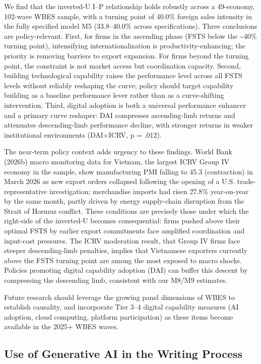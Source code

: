 \documentclass[
  12pt,a4paper]{article}
\begin{document}
We find that the inverted-U I--P relationship holds robustly across a
49-economy, 102-wave WBES sample, with a turning point of 40.0\% foreign
sales intensity in the fully specified model M5 (33.8--40.0\% across
specifications). Three conclusions are policy-relevant. First, for firms
in the ascending phase (FSTS below the \textasciitilde40\% turning
point), intensifying internationalization is productivity-enhancing; the
priority is removing barriers to export expansion. For firms beyond the
turning point, the constraint is not market access but coordination
capacity. Second, building technological capability raises the
performance level across all FSTS levels without reliably reshaping the
curve; policy should target capability building as a baseline
performance lever rather than as a curve-shifting intervention. Third,
digital adoption is both a universal performance enhancer and a primary
curve reshaper: DAI compresses ascending-limb returns and attenuates
descending-limb performance decline, with stronger returns in weaker
institutional environments (DAI×ICRV, p = .012).

The near-term policy context adds urgency to these findings. World Bank
(2026b) macro monitoring data for Vietnam, the largest ICRV Group IV
economy in the sample, show manufacturing PMI falling to 45.3
(contraction) in March 2026 as new export orders collapsed following the
opening of a U.S. trade-representative investigation; merchandise
imports had risen 27.8\% year-on-year by the same month, partly driven
by energy supply-chain disruption from the Strait of Hormuz conflict.
These conditions are precisely those under which the right-side of the
inverted-U becomes consequential: firms pushed above their optimal FSTS
by earlier export commitments face amplified coordination and input-cost
pressures. The ICRV moderation result, that Group IV firms face steeper
descending-limb penalties, implies that Vietnamese exporters currently
above the FSTS turning point are among the most exposed to macro shocks.
Policies promoting digital capability adoption (DAI) can buffer this
descent by compressing the descending limb, consistent with our M8/M9
estimates.

Future research should leverage the growing panel dimensions of WBES to
establish causality, and incorporate Tier 3--4 digital capability
measures (AI adoption, cloud computing, platform participation) as these
items become available in the 2025+ WBES waves.

\hypertarget{use-of-generative-ai-in-the-writing-process}{%
\subsection{Use of Generative AI in the Writing
Process}\label{use-of-generative-ai-in-the-writing-process}}
\end{document}
